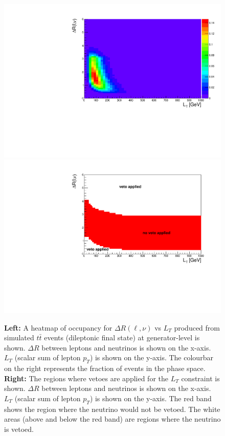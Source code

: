 \begin{figure}[h!]
	\includegraphics[width=0.45\linewidth]{figures/lt_occ_2vSM.pdf}
	\includegraphics[width=0.45\linewidth]{figures/lt_veto_2vSM.pdf}
	\centering
	\caption{\textbf{Left: }A heatmap of occupancy for $\Delta R (\ell, \nu)$ vs $L_{T}$ produced from simulated $t\bar{t}$ events (dileptonic final state) at generator-level is shown. $\Delta R$ between leptons and neutrinos is shown on the x-axis. $L_{T}$ (scalar sum of lepton $p_{T}$) is shown on the y-axis. The colourbar on the right represents the fraction of events in the phase space. \textbf{Right: }The regions where vetoes are applied for the $L_{T}$ constraint is shown. $\Delta R$ between leptons and neutrinos is shown on the x-axis. $L_{T}$ (scalar sum of lepton $p_{T}$) is shown on the y-axis. The red band shows the region where the neutrino would not be vetoed. The white areas (above and below the red band) are regions where the neutrino is vetoed. }
	\label{fig:lt-heatmap}

\end{figure}
